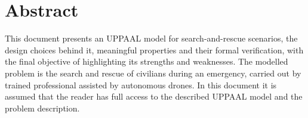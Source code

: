 
\section{Abstract}
This document presents an UPPAAL model for search-and-rescue scenarios, the design choices behind it, meaningful properties and their formal verification, with the final objective of highlighting its strengths and weaknesses. 
The modelled problem is the search and rescue of civilians during an emergency, carried out by trained professional assisted by autonomous drones.
In this document it is assumed that the reader has full access to the described UPPAAL model and the problem description.